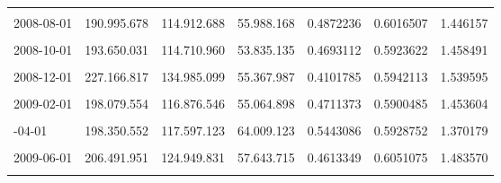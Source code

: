 \documentclass[12pt]{article}
\begin{document}
\begin{longtable}[t]{llllrrr}
\cellcolor{gray!10}{2008-07-01} & \cellcolor{gray!10}{189.986.585} & \cellcolor{gray!10}{116.080.696} & \cellcolor{gray!10}{55.186.302} & \cellcolor{gray!10}{0.4754133} & \cellcolor{gray!10}{0.6109942} & \cellcolor{gray!10}{1.471712}\\
2008-08-01 & 190.995.678 & 114.912.688 & 55.988.168 & 0.4872236 & 0.6016507 & 1.446157\\
\cellcolor{gray!10}{2008-09-01} & \cellcolor{gray!10}{199.382.244} & \cellcolor{gray!10}{121.931.736} & \cellcolor{gray!10}{59.485.668} & \cellcolor{gray!10}{0.4878604} & \cellcolor{gray!10}{0.6115476} & \cellcolor{gray!10}{1.456023}\\
2008-10-01 & 193.650.031 & 114.710.960 & 53.835.135 & 0.4693112 & 0.5923622 & 1.458491\\
\addlinespace
\cellcolor{gray!10}{2008-11-01} & \cellcolor{gray!10}{201.858.589} & \cellcolor{gray!10}{119.894.037} & \cellcolor{gray!10}{50.354.208} & \cellcolor{gray!10}{0.4199893} & \cellcolor{gray!10}{0.5939506} & \cellcolor{gray!10}{1.525548}\\
2008-12-01 & 227.166.817 & 134.985.099 & 55.367.987 & 0.4101785 & 0.5942113 & 1.539595\\
\cellcolor{gray!10}{2009-01-01} & \cellcolor{gray!10}{199.815.307} & \cellcolor{gray!10}{116.952.314} & \cellcolor{gray!10}{54.674.882} & \cellcolor{gray!10}{0.4674972} & \cellcolor{gray!10}{0.5853021} & \cellcolor{gray!10}{1.452802}\\
2009-02-01 & 198.079.554 & 116.876.546 & 55.064.898 & 0.4711373 & 0.5900485 & 1.453604\\
\cellcolor{gray!10}{2009-03-01} & \cellcolor{gray!10}{196.166.112} & \cellcolor{gray!10}{117.318.742} & \cellcolor{gray!10}{56.208.995} & \cellcolor{gray!10}{0.4791135} & \cellcolor{gray!10}{0.5980581} & \cellcolor{gray!10}{1.452476}\\
\addlinespace
2009-04-01 & 198.350.552 & 117.597.123 & 64.009.123 & 0.5443086 & 0.5928752 & 1.370179\\
\cellcolor{gray!10}{2009-05-01} & \cellcolor{gray!10}{199.654.739} & \cellcolor{gray!10}{118.154.447} & \cellcolor{gray!10}{51.822.628} & \cellcolor{gray!10}{0.4386007} & \cellcolor{gray!10}{0.5917939} & \cellcolor{gray!10}{1.497527}\\
2009-06-01 & 206.491.951 & 124.949.831 & 57.643.715 & 0.4613349 & 0.6051075 & 1.483570\\
\cellcolor{gray!10}{2009-07-01} & \cellcolor{gray!10}{202.506.493} & \cellcolor{gray!10}{118.838.033} & \cellcolor{gray!10}{51.877.383} & \cellcolor{gray!10}{0.4365386} & \cellcolor{gray!10}{0.5868357} & \cellcolor{gray!10}{1.494007}\\

\end{longtable}
\end{document}
